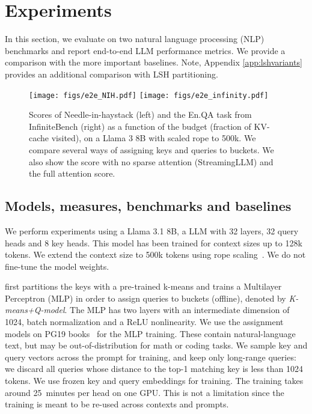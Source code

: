 
\ificml 
\vspace{-0.2em}
\fi
\section{Experiments}
\label{sec:experiments}

\ificml 
\vspace{-0.1em}
\fi
In this section, we evaluate \OURS on two natural language processing (NLP) benchmarks and report end-to-end LLM performance metrics. We provide a comparison with the more important baselines. Note, Appendix \ref{app:lshvariants} provides an additional comparison with LSH partitioning. 

\begin{figure*}
%
%
    \texttt{[image: figs/e2e\_NIH.pdf]}
    \hfill
    \texttt{[image: figs/e2e\_infinity.pdf]}
    \vspace{-0.5em}
    \caption{
    Scores of Needle-in-haystack (left) and the En.QA task from InfiniteBench (right) as a function of the budget (fraction of KV-cache visited), on a Llama 3 8B with scaled rope to 500k. 
    We compare several ways of assigning keys and queries to buckets.
    We also show the score with no sparse attention (StreamingLLM) and the full attention score. 
    }
    \label{fig:accuracyatbudget}
\end{figure*}



\subsection{Models, measures, benchmarks and baselines}

We perform experiments using a Llama 3.1 8B, a LLM with 32 layers, 32 query heads and 8 key heads.
This model has been trained for context sizes up to 128k tokens. 
We extend the context size to 500k tokens using  rope scaling~\citep{peng2023yarnefficientcontextwindow}. 
We do not fine-tune the model weights. %

\OURS first partitions the keys with a pre-trained k-means and trains a Multilayer Perceptron (MLP) in order to assign queries to buckets (offline), denoted by \textit{K-means+Q-model}. The MLP has two layers with an intermediate dimension of 1024, batch normalization and a ReLU nonlinearity.
We use the \OURS assignment models on PG19 books~\citep{raecompressive2019} for the MLP training.
These contain natural-language text, but may be out-of-distribution for math or coding tasks.
We sample key and query vectors across the prompt for training, and keep only long-range queries: we discard all queries whose distance to the top-1 matching key is less than 1024 tokens.
We use frozen key and query embeddings for training. The training takes around 25~minutes per head on one GPU. 
This is not a limitation since the training is meant to be re-used across contexts and prompts.

